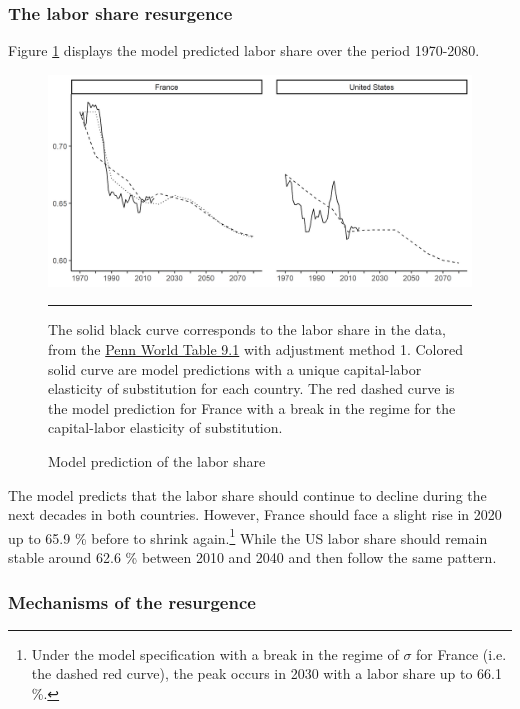 \subsubsection{The labor share resurgence}

Figure \ref{fig:pred_data_7080} displays the model predicted labor share over the period 1970-2080.
\begin{figure}[tb]
	\centering
	\includegraphics[width=1\linewidth]{../result/baseline7080.png}
	\caption{Model prediction of the labor share}
	\label{fig:pred_data_7080}
	\vspace{.5ex}
	\hrule
	\vspace{-4ex}
	\justify\singlespacing\footnotesize The solid black curve corresponds to the labor share in the data, from the \href{https://www.rug.nl/ggdc/productivity/pwt/}{Penn World Table 9.1} with adjustment method 1. Colored solid curve are model predictions with a unique capital-labor elasticity of substitution for each country. The red dashed curve is the model prediction for France with a break in the regime for the capital-labor elasticity of substitution.
\end{figure}
The model predicts that the labor share should continue to decline during the next decades in both countries. However, France should face a slight rise in 2020 up to 65.9 \% before to shrink again.\footnote{Under the model specification with a break in the regime of $\sigma$ for France (i.e. the dashed red curve), the peak occurs in 2030 with a labor share up to 66.1 \%.} While the US labor share should remain stable around 62.6 \% between 2010 and 2040 and then follow the same pattern.

\subsubsection{Mechanisms of the resurgence}

